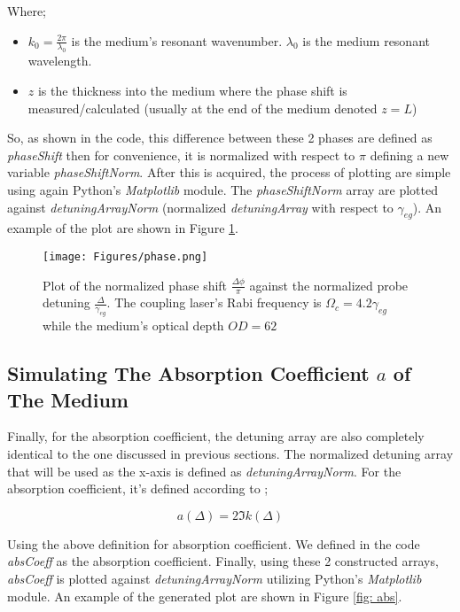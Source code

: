 Where;

\begin{itemize}
    \item $k_{0} = \frac{2\pi}{\lambda_{0}}$ is the medium's resonant wavenumber. $\lambda_{0}$ is the medium resonant wavelength.
    \item $z$ is the thickness into the medium where the phase shift is measured/calculated (usually at the end of the medium denoted $z = L$)
\end{itemize}

So, as shown in the code, this difference between these 2 phases are defined as \textit{phaseShift} then for convenience, it is normalized with respect to $\pi$ defining a new variable \textit{phaseShiftNorm}. After this is acquired, the process of plotting are simple using again Python's \textit{Matplotlib} module. The \textit{phaseShiftNorm} array are plotted against \textit{detuningArrayNorm} (normalized \textit{detuningArray} with respect to $\gamma_{eg}$). An example of the plot are shown in Figure \ref{fig: phase}.

\begin{figure}
    \centering
    \texttt{[image: Figures/phase.png]}
    \caption[Plot of The Phase Shift Between The Transmitted Field and The Incident Field As A Function of Incidetn Probe Laser Detuning]{Plot of the normalized phase shift $\frac{\Delta\phi}{\pi}$ against the normalized probe detuning $\frac{\Delta}{\gamma_{eg}}$. The coupling laser's Rabi frequency is $\Omega_{c} = 4.2\gamma_{eg}$ while the medium's optical depth $OD = 62$}
    \label{fig: phase}
\end{figure}

\subsection{Simulating The Absorption Coefficient $a$ of The Medium}
Finally, for the absorption coefficient, the detuning array are also completely identical to the one discussed in previous sections. The normalized detuning array that will be used as the x-axis is defined as \textit{detuningArrayNorm}. For the absorption coefficient, it's defined according to \cite{boyd2020nonlinear};

\begin{equation}
    a(\Delta) = 2 \Im{k(\Delta)}
\end{equation}

Using the above definition for absorption coefficient. We defined in the code \textit{absCoeff} as the absorption coefficient. Finally, using these 2 constructed arrays, \textit{absCoeff} is plotted against \textit{detuningArrayNorm} utilizing Python's \textit{Matplotlib} module. An example of the generated plot are shown in Figure \ref{fig: abs}.

